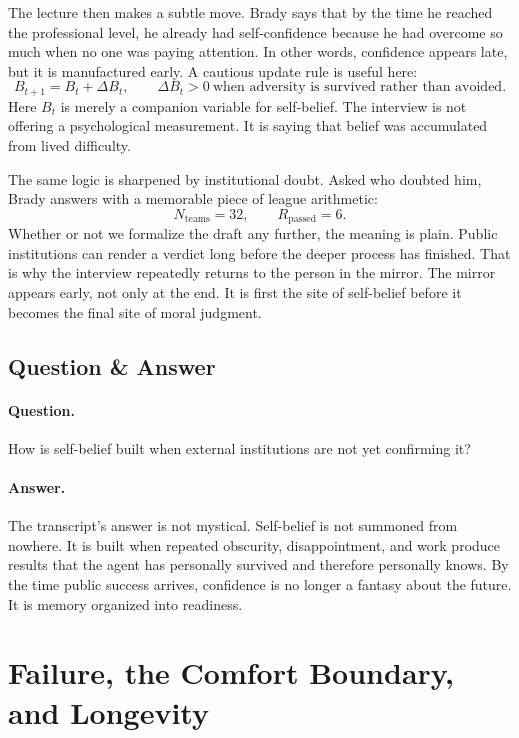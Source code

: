 The lecture then makes a subtle move. Brady says that by the time he reached the professional level, he already had self-confidence because he had overcome so much when no one was paying attention. In other words, confidence appears late, but it is manufactured early. A cautious update rule is useful here:
\begin{equation}
B_{t+1}=B_t+\Delta B_t,
\qquad
\Delta B_t>0
\ \text{when adversity is survived rather than avoided.}
\end{equation}
Here \(B_t\) is merely a companion variable for self-belief. The interview is not offering a psychological measurement. It is saying that belief was accumulated from lived difficulty.

The same logic is sharpened by institutional doubt. Asked who doubted him, Brady answers with a memorable piece of league arithmetic:
\begin{equation}
N_{\text{teams}}=32,
\qquad
R_{\text{passed}}=6.
\end{equation}
Whether or not we formalize the draft any further, the meaning is plain. Public institutions can render a verdict long before the deeper process has finished. That is why the interview repeatedly returns to the person in the mirror. The mirror appears early, not only at the end. It is first the site of self-belief before it becomes the final site of moral judgment.

\subsection{Question \& Answer}

\paragraph{Question.} How is self-belief built when external institutions are not yet confirming it?

\paragraph{Answer.} The transcript's answer is not mystical. Self-belief is not summoned from nowhere. It is built when repeated obscurity, disappointment, and work produce results that the agent has personally survived and therefore personally knows. By the time public success arrives, confidence is no longer a fantasy about the future. It is memory organized into readiness.

\section{Failure, the Comfort Boundary, and Longevity}

